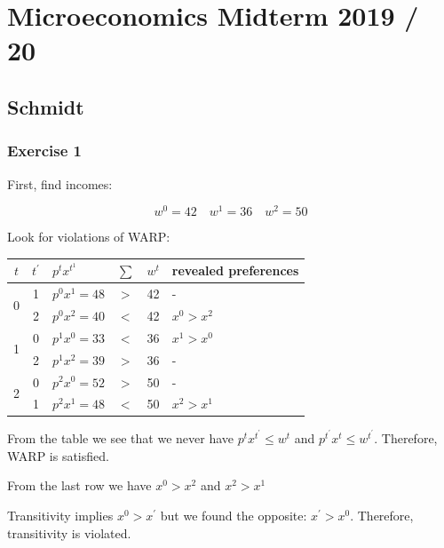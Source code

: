 \section{Microeconomics Midterm 2019 / 20}

{
\subsection*{Schmidt}

{
\subsubsection*{Exercise 1}

\begin{enumerate}[label=(\roman*)]
{\item 
First, find incomes:

$$
w^{0}=42 \quad w^{1}=36 \quad w^{2}=50
$$

Look for violations of WARP:

\begin{table}[!htp]
    \centering
    \begin{tabular}{|c|c|l|l|l|l|}
    \hline
    $t$ & $t^{\prime}$ & $p^{t} x^{t^{1}}$ & $\sum$ & $w^{t}$ & revealed preferences \\
    \hline \multirow{2}{*}{0} & 1 & $p^{0} x^{1}=48$ & $>$ & 42 & - \\
    \cline { 2 - 6 } & 2 & $p^{0} x^{2}=40$ & $<$ & 42 & $x^{0}>x^{2}$ \\
    \hline \multirow{2}{*}{1} & 0 & $p^{1} x^{0}=33$ & $<$ & 36 & $x^{1}>x^{0}$ \\
    \cline { 2 - 6 } & 2 & $p^{1} x^{2}=39$ & $>$ & 36 & - \\
    \hline \multirow{2}{*}{2} & 0 & $p^{2} x^{0}=52$ & $>$ & 50 & - \\
    \cline { 2 - 6 } & 1 & $p^{2} x^{1}=48$ & $<$ & 50 & $x^{2}>x^{1}$ \\
    \hline
    \end{tabular}
\end{table}

From the table we see that we never have $p^{t} x^{t^{\prime}} \leq w^{t}$ and $p^{t^{\prime}} x^{t} \leq w^{t^{\prime}}$. Therefore, WARP is satisfied.
}
{\item 
From the last row we have $x^{0}>x^{2}$ and $x^{2}>x^{1}$

Transitivity implies $x^{0}>x^{\prime}$ but we found the opposite: $x^{\prime}>x^{0}$. Therefore, transitivity is violated.
}
\end{enumerate}
}
{
}}
